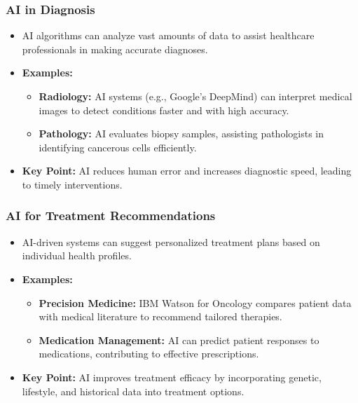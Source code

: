 \documentclass[aspectratio=169]{beamer}
\begin{document}
\begin{frame}[fragile]
    \frametitle{AI in Diagnosis}
    \begin{itemize}
        \item AI algorithms can analyze vast amounts of data to assist healthcare professionals in making accurate diagnoses.
        \item \textbf{Examples:}
        \begin{itemize}
            \item \textbf{Radiology:} AI systems (e.g., Google's DeepMind) can interpret medical images to detect conditions faster and with high accuracy.
            \item \textbf{Pathology:} AI evaluates biopsy samples, assisting pathologists in identifying cancerous cells efficiently.
        \end{itemize}
        \item \textbf{Key Point:} AI reduces human error and increases diagnostic speed, leading to timely interventions.
    \end{itemize}
\end{frame}

\begin{frame}[fragile]
    \frametitle{AI for Treatment Recommendations}
    \begin{itemize}
        \item AI-driven systems can suggest personalized treatment plans based on individual health profiles.
        \item \textbf{Examples:}
        \begin{itemize}
            \item \textbf{Precision Medicine:} IBM Watson for Oncology compares patient data with medical literature to recommend tailored therapies.
            \item \textbf{Medication Management:} AI can predict patient responses to medications, contributing to effective prescriptions.
        \end{itemize}
        \item \textbf{Key Point:} AI improves treatment efficacy by incorporating genetic, lifestyle, and historical data into treatment options.
    \end{itemize}
\end{frame}
\end{document}
